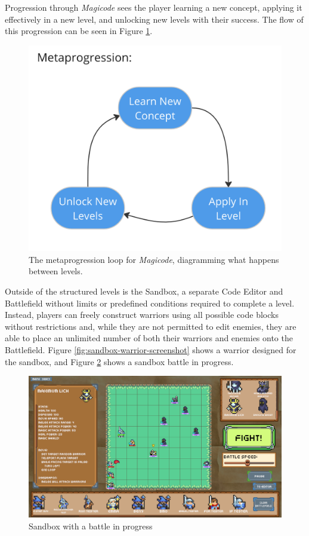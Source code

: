 \documentclass[10pt,twocolumn]{article}
\begin{document}
Progression through \textit{Magicode} sees the player learning a new concept, applying it effectively in a new level, and unlocking new levels with their success. The flow of this progression can be seen in Figure \ref{fig:metaprogression-loop}.

\begin{figure}
    \centering
    \includegraphics[width=.5\linewidth]{images/metaprogression-loop.png}
    \caption{The metaprogression loop for \textit{Magicode}, diagramming what happens between levels.}
    \label{fig:metaprogression-loop}
\end{figure}

Outside of the structured levels is the Sandbox, a separate Code Editor and Battlefield without limits or predefined conditions required to complete a level. Instead, players can freely construct warriors using all possible code blocks without restrictions and, while they are not permitted to edit enemies, they are able to place an unlimited number of both their warriors and enemies onto the Battlefield. Figure \ref{fig:sandbox-warrior-screenshot} shows a warrior designed for the sandbox, and Figure \ref{fig:sandbox-battle-screenshot} shows a sandbox battle in progress.

\begin{figure}
    \centering
    \includegraphics[width=\linewidth]{images/screenshots/sandbox_battle_3.png}
    \caption{Sandbox with a battle in progress}
    \label{fig:sandbox-battle-screenshot}
\end{figure}
\end{document}
